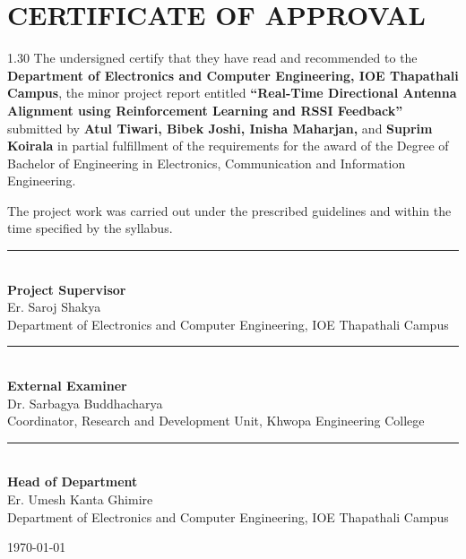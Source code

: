 \newpage
\thispagestyle{empty}

\vspace*{1.3in}

\section*{CERTIFICATE OF APPROVAL}
{}

\begin{spacing}{1.30}
The undersigned certify that they have read and recommended to the \textbf{Department of 
Electronics and Computer Engineering, IOE Thapathali Campus}, the minor project 
report entitled \textbf{``Real-Time Directional Antenna Alignment using Reinforcement Learning and RSSI Feedback''} 
submitted by \textbf{Atul Tiwari, Bibek Joshi, Inisha Maharjan,} and \textbf{Suprim Koirala} in partial fulfillment of the requirements for the award of the Degree of Bachelor of Engineering in Electronics, Communication and Information Engineering.

The project work was carried out under the prescribed guidelines and within the time specified by the syllabus.
\end{spacing}

\vspace{0.5cm}

\rule{7cm}{0.4pt}\\[-2mm]
\textbf{Project Supervisor}\\
Er. Saroj Shakya\\
Department of Electronics and Computer Engineering, IOE Thapathali Campus

\vspace{0.2cm}

\rule{7cm}{0.4pt}\\[-2mm]
\textbf{External Examiner}\\
Dr. Sarbagya Buddhacharya\\
Coordinator, Research and Development Unit, Khwopa Engineering College

\vspace{0.2cm}

\rule{7cm}{0.4pt}\\[-2mm]
\textbf{Head of Department}\\
Er. Umesh Kanta Ghimire\\
Department of Electronics and Computer Engineering, IOE Thapathali Campus

\vspace{0.4cm}

{\monthyeardate\today}